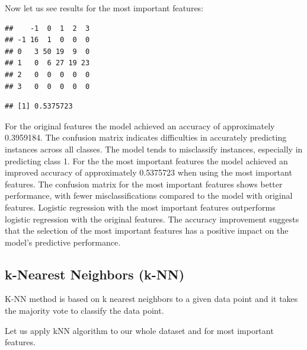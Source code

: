 \documentclass[11pt,a4paper]{article}\usepackage[]{graphicx}\usepackage[]{xcolor}
\makeatletter
\newenvironment{kframe}{%
 \def\at@end@of@kframe{}%
 \ifinner\ifhmode%
  \def\at@end@of@kframe{\end{minipage}}%
  \begin{minipage}{\columnwidth}%
 \fi\fi%
 \def\FrameCommand##1{\hskip\@totalleftmargin \hskip-\fboxsep
 \colorbox{shadecolor}{##1}\hskip-\fboxsep
     \hskip-\linewidth \hskip-\@totalleftmargin \hskip\columnwidth}%
 \MakeFramed {\advance\hsize-\width
   \@totalleftmargin\z@ \linewidth\hsize
   \@setminipage}}%
 {\par\unskip\endMakeFramed%
 \at@end@of@kframe}
\newenvironment{knitrout}{}{} %
\makeatother
\begin{document}
	Now let us see results for the most important features:
	
\begin{knitrout}
\color{fgcolor}\begin{kframe}
\begin{verbatim}
##    -1  0  1  2  3
## -1 16  1  0  0  0
## 0   3 50 19  9  0
## 1   0  6 27 19 23
## 2   0  0  0  0  0
## 3   0  0  0  0  0
\end{verbatim}
\end{kframe}
\end{knitrout}

\begin{knitrout}
\color{fgcolor}\begin{kframe}
\begin{verbatim}
## [1] 0.5375723
\end{verbatim}
\end{kframe}
\end{knitrout}
	
For the original features the model achieved an accuracy of approximately 0.3959184.
The confusion matrix indicates difficulties in accurately predicting instances across all classes. The model tends to misclassify instances, especially in predicting class 1.
For the the most important features the model achieved an improved accuracy of approximately 0.5375723 when using the most important features.
The confusion matrix for the most important features shows better performance, with fewer misclassifications compared to the model with original features.
Logistic regression with the most important features outperforms logistic regression with the original features.
The accuracy improvement suggests that the selection of the most important features has a positive impact on the model's predictive performance.

	
	\subsection{k-Nearest Neighbors (k-NN)}
	
	K-NN method is based on k nearest neighbors to a given data point and it takes the majority vote to classify the data point.
	
Let us apply kNN algorithm to our whole dataset and for most important features. 

	
\end{document}
